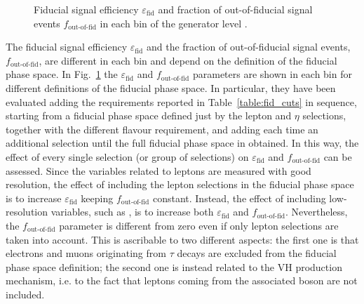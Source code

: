 \begin{figure}[htb]
\centering
{}
\caption{Fiducial signal efficiency $\varepsilon_\mathrm{fid}$ and fraction of out-of-fiducial signal events $f_{\text{out-of-fid}}$ in each bin of the generator level \pth.\label{fig:sel_eff}}
\end{figure}

The fiducial signal efficiency $\varepsilon_\mathrm{fid}$ and the fraction of out-of-fiducial signal events, $f_{\text{out-of-fid}}$, are different in each \pth bin and depend on the definition of the fiducial phase space. In Fig.~\ref{fig:sel_eff} the $\varepsilon_\mathrm{fid}$ and $f_{\text{out-of-fid}}$ parameters are shown in each \pth bin for different definitions of the fiducial phase space. In particular, they have been evaluated adding the requirements reported in Table~\ref{table:fid_cuts} in sequence, starting from a fiducial phase space defined just by the lepton \pt and $\eta$ selections, together with the different flavour requirement, and adding each time an additional selection until the full fiducial phase space in obtained. In this way, the effect of every single selection (or group of selections) on $\varepsilon_\mathrm{fid}$ and $f_{\text{out-of-fid}}$ can be assessed. Since the variables related to leptons are measured with good resolution, the effect of including the lepton selections in the fiducial phase space is to increase $\varepsilon_\mathrm{fid}$ keeping $f_{\text{out-of-fid}}$ constant. Instead, the effect of including low-resolution variables, such as \mt, is to increase both $\varepsilon_\mathrm{fid}$ and $f_{\text{out-of-fid}}$. Nevertheless, the $f_{\text{out-of-fid}}$ parameter is different from zero even if only lepton selections are taken into account. This is ascribable to two different aspects: the first one is that electrons and muons originating from $\tau$ decays are excluded from the fiducial phase space definition; the second one is instead related to the VH production mechanism, i.e. to the fact that leptons coming from the associated boson are not included.

